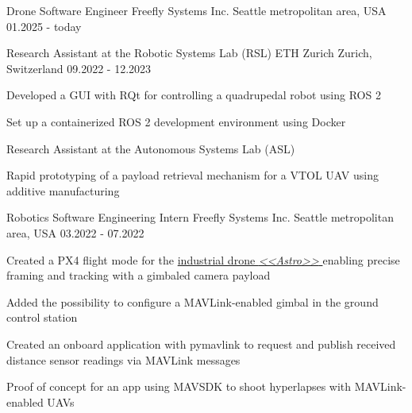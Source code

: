 

\begin{cventries}

  \cventry
  {Drone Software Engineer} %
  {Freefly Systems Inc.} %
  {Seattle metropolitan area, USA} %
  {01.2025 - today} %
  {
  }

  \cventry
    {Research Assistant at the Robotic Systems Lab (RSL)} %
    {ETH Zurich} %
    {Zurich, Switzerland} %
    {09.2022 - 12.2023} %
    {
      \begin{cvitems}
        \item Developed a GUI with RQt for controlling a quadrupedal robot using ROS 2
        \item Set up a containerized ROS 2 development environment using Docker
      \end{cvitems}
    }

  \cventry
    {Research Assistant at the Autonomous Systems Lab (ASL)} %
    {} %
    {} %
    {} %
    {
      \begin{cvitems}
        \item Rapid prototyping of a payload retrieval mechanism for a VTOL UAV using additive manufacturing
      \end{cvitems}
    }

  \cventry
    {Robotics Software Engineering Intern} %
    {Freefly Systems Inc.} %
    {Seattle metropolitan area, USA} %
    {03.2022 - 07.2022} %
    {
      \begin{cvitems}
        \item Created a PX4 flight mode for the \href{https://freeflysystems.com/astro}{industrial drone \textit{<<Astro>>} \ExternalLink} enabling precise framing and tracking with a gimbaled camera payload
        \item Added the possibility to configure a MAVLink-enabled gimbal in the ground control station
        \item Created an onboard application with pymavlink to request and publish received distance sensor readings via MAVLink messages
        \item Proof of concept for an app using MAVSDK to shoot hyperlapses with MAVLink-enabled UAVs
      \end{cvitems}
    }


\end{cventries}
